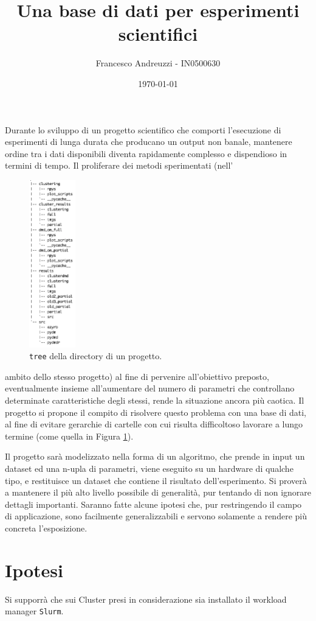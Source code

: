 \documentclass{article}
\title{Una base di dati per esperimenti scientifici}
\author{Francesco Andreuzzi - IN0500630}
\date{\today}
\begin{document}
\maketitle

Durante lo sviluppo di un progetto scientifico che comporti l'esecuzione di esperimenti di lunga durata che producano un output non banale, mantenere ordine tra i dati disponibili diventa rapidamente complesso e dispendioso in termini di tempo. Il proliferare dei metodi sperimentati (nell'\hphantom{xcjxxsksjskksksk}
\begin{figure}
    \vspace{-0.9cm}
    \includegraphics[width=2cm]{res/tree_brutto.png}
    \caption{\texttt{tree} della directory di un progetto.}\label{fig:tree}
\end{figure}
ambito dello stesso progetto) al fine di pervenire all'obiettivo preposto, eventualmente insieme all'aumentare del numero di parametri che controllano determinate caratteristiche degli stessi, rende la situazione ancora più caotica.  Il progetto si propone il compito di risolvere questo problema con una base di dati, al fine di evitare gerarchie di cartelle con cui risulta difficoltoso lavorare a lungo termine (come quella in Figura \ref{fig:tree}).

Il progetto sarà modelizzato nella forma di un algoritmo, che prende in input un dataset ed una n-upla di parametri, viene eseguito su un hardware di qualche tipo, e restituisce un dataset che contiene il risultato dell'esperimento. Si proverà a mantenere il più alto livello possibile di generalità, pur tentando di non ignorare dettagli importanti. Saranno fatte alcune ipotesi che, pur restringendo il campo di applicazione, sono facilmente generalizzabili e servono solamente a rendere più concreta l'esposizione.

\section{Ipotesi}
\label{sec:ipotesi}
Si supporrà che sui Cluster presi in considerazione sia installato il workload manager \texttt{Slurm}.
\end{document}
